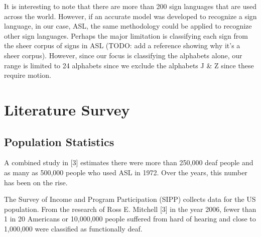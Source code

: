 \documentclass[12pt]{article}
\begin{document}
It is interesting to note that there are more than 200 sign languages that are 
used across the world. However, if an accurate model was developed to 
recognize a sign language, in our case, ASL, the same methodology could be 
applied to recognize other sign languages. Perhaps the major limitation is 
classifying each sign from the sheer corpus of signs in ASL (TODO: add a 
reference showing why it’s a sheer corpus). However, since our focus is 
classifying the alphabets alone, our range is limited to 24 alphabets since we 
exclude the alphabets J \& Z since these require motion.

\section{Literature Survey}

\subsection{Population Statistics}
A combined study in [3] estimates there were more than 250,000 deaf people and 
as many as 500,000 people who used ASL in 1972. Over the years, this number 
has been on the rise.

The Survey of Income and Program Participation (SIPP) collects data for the US 
population. From the research of Ross E. Mitchell [3] in the year 2006, fewer 
than 1 in 20 Americans or 10,000,000 people suffered from hard of hearing and 
close to 1,000,000 were classified as functionally deaf.
\end{document}
